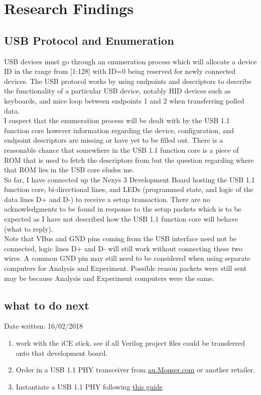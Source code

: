 \documentclass[10pt,a4paper]{article}
\begin{document}
\section{Research Findings}
\subsection{USB Protocol and Enumeration}
USB devices must go through an enumeration process which will allocate a device ID in the range from [1:128] with ID=0 being reserved for newly connected devices. The USB protocol works by using endpoints and descriptors to describe the functionality of a particular USB device, notably HID devices such as keyboards, and mice loop between endpoints 1 and 2 when transferring polled data.\\

I suspect that the enumeration process will be dealt with by the USB 1.1 function core however information regarding the device, configuration, and endpoint descriptors are missing or have yet to be filled out. There is a reasonable chance that somewhere in the USB 1.1 function core is a piece of ROM that is used to fetch the descriptors from but the question regarding where that ROM lies in the USB core eludes me.\\

So far, I have connected up the Nexys 3 Development Board hosting the USB 1.1 function core, bi-directional lines, and LEDs (programmed state, and logic of the data lines D+ and D-) to receive a setup transaction. There are no acknowledgments to be found in response to the setup packets which is to be expected as I have not described how the USB 1.1 function core will behave (what to reply).\\

Note that VBus and GND pins coming from the USB interface need not be connected, logic lines D+ and D- will still work without connecting these two wires. A common GND pin may still need to be considered when using separate computers for Analysis and Experiment. Possible reason packets were still sent may be because Analysis and Experiment computers were the same. \\

\subsection{what to do next}
Date written: 16/02/2018
\begin{enumerate}
	\item work with the iCE stick, see if all Verilog project files could be transferred onto that development board.
	\item Order in a USB 1.1 PHY transceiver from \href{https://au.mouser.com/Semiconductors/Interface-ICs/USB-Interface-IC/_/N-45lw3Z1yzvvqx?P=1yxy7lq&pop=3nh2d&Ns=Pricing|0}{au.Mouser.com} or another retailer.
	\item Instantiate a USB 1.1 PHY following \href{http://www.xess.com/projects/fpga-usb-v2-project/}{this guide}
\end{enumerate}
\end{document}
